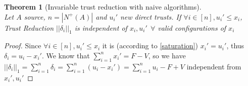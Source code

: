 \documentclass[11pt]{article}
\newtheorem{theorem}{Theorem}[section]
\theoremstyle{definition}
\theoremstyle{corollary}
\theoremstyle{lemma}
\begin{document}
    \begin{theorem}[Invariable trust reduction with naive algorithms] \ \\
    \label{invariability}
       Let $A$ source, $n = |N^{+}(A)|$ and $u_i'$ new direct trusts. If $\forall i \in [n],u_i' \leq x_i$,
       Trust Reduction $||\delta_i||_1$ is independent of $x_i, u_i' \:\: \forall$ valid configurations of $x_i$
    \end{theorem}
    \begin{proof} 
       Since $\forall i \in [n],u_i' \leq x_i$ it is (according to \ref{saturation}) $x_i' = u_i'$, thus
       $\delta_i = u_i - x_i'$. We know that $\sum\limits_{i=1}^{n}x_i' = F - V$, so we have $||\delta_i||_1 =
       \sum\limits_{i=1}^{n}\delta_i = \sum\limits_{i=1}^{n}(u_i - x_i') = \sum\limits_{i=1}^{n}u_i - F + V$ independent
       from $x_i', u_i'$
    \end{proof}
\end{document}
